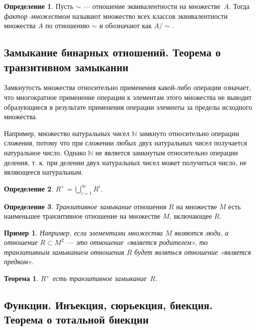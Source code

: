\documentclass{article}
\newtheorem*{theorem*}{Теорема}
\theoremstyle{plain}
\newtheorem*{example*}{Пример}
\theoremstyle{definition}
\newtheorem{definition}{Определение}[subsection]
\begin{document}
\begin{definition}
	Пусть \(\sim\) — отношение эквивалентности на множестве~\(A\). Тогда \textit{фактор–множеством} называют множество всех классов эквивалентности множества \(A\) по отношению \(\sim\) и обозначают как \(A / \sim\).
\end{definition}

\subsection{Замыкание бинарных отношений. Теорема о транзитивном замыкании}

Замкнутость множества относительно применения какой-либо операции означает, что многократное применение операции к элементам этого множества не выводит образующиеся в результате применения операции элементы за пределы исходного множества.

Например, множество натуральных чисел \(\mathbb{N}\) замкнуто относительно операции сложения, потому что при сложении любых двух натуральных чисел получается натуральное число. Однако \(\mathbb{N}\) не является замкнутым относительно операции деления, т. к. при делении двух натуральных чисел может получиться число, не являющееся натуральным.

\begin{definition}
	\(R^+ = \bigcup \limits ^{{\infty}} _{{i = 1}}R^{i}.\)
\end{definition}

\begin{definition}
	\textit{Транзитивное замыкание} отношения \(R\) на множестве \(M\) есть наименьшее транзитивное отношение на множестве \(M\), включающее \(R\).
\end{definition}

\begin{example*}
	Например, если элементами множества \(M\) являются люди, а отношение \(R \subset M^2\) — это отношение «является родителем», то транзитивным замыканием отношения \(R\) будет являться отношение «является предком».
\end{example*}

\begin{theorem*}
	\(R^+\) есть транзитивное замыкание~\(R\).
\end{theorem*}

\subsection{Функции. Инъекция, сюрьекция, биекция. Теорема о тотальной биекции}
\end{document}
